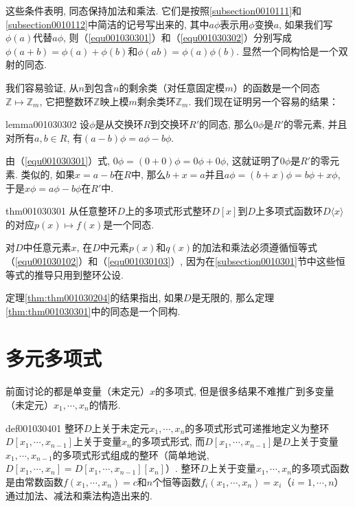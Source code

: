 这些条件表明, 同态保持加法和乘法. 它们是按照\ref{subsection0010111}和\ref{subsection0010112}中简洁的记号写出来的, 其中$a\phi$表示用$\phi$变换$a$, 如果我们写$\phi(a)$代替$a\phi$, 则（\ref{equ001030301}）和（\ref{equ001030302}）分别写成$\phi(a+b)=\phi(a)+\phi(b)$和$\phi(ab)=\phi(a)\phi(b)$. 显然一个同构恰是一个双射的同态. 

我们容易验证, 从$n$到包含$n$的剩余类（对任意固定模$m$）的函数是一个同态$\mathbb{Z}\mapsto \mathbb{Z}_m$, 它把整数环$\mathbb{Z}$映上模$m$剩余类环$\mathbb{Z}_m$. 我们现在证明另一个容易的结果：
\begin{lemma}{}{lemma001030302}
设$\phi$是从交换环$R$到交换环$R'$的同态, 那么$0\phi$是$R'$的零元素, 并且对所有$a, b \in R$, 有$(a-b)\phi = a\phi - b\phi$. 
\end{lemma}

由（\ref{equ001030301}）式, $0\phi = (0+0)\phi = 0\phi + 0\phi$, 这就证明了$0\phi$是$R'$的零元素. 类似的, 如果$x=a-b$在$R$中, 那么$b+x=a$并且$a\phi = (b+x)\phi = b\phi+x\phi$, 于是$x\phi = a\phi - b\phi$在$R'$中. 

\begin{theorem}{}{thm001030301}
从任意整环$D$上的多项式形式整环$D[x]$到$D$上多项式函数环$D\langle{x}\rangle$的对应$p(x)\mapsto f(x)$是一个同态. 
\end{theorem}

对$D$中任意元素$x$, 在$D$中元素$p(x)$和$q(x)$的加法和乘法必须遵循恒等式（\ref{equ001030102}）和（\ref{equ001030103}）, 因为在\ref{subsection0010301}节中这些恒等式的推导只用到整环公设. 

定理\ref{thm:thm001030204}的结果指出, 如果$D$是无限的, 那么定理\ref{thm:thm001030301}中的同态是一个同构. 


\section{多元多项式}\label{subsection0010304}
前面讨论的都是单变量（未定元）$x$的多项式, 但是很多结果不难推广到多变量（未定元）$x_1, \cdots, x_n$的情形. 
\begin{definition}{}{def001030401}
整环$D$上关于未定元$x_1, \cdots, x_n$的多项式形式可递推地定义为整环$D[x_1,\cdots,x_{n-1}]$上关于变量$x_n$的多项式形式, 而$D[x_1,\cdots,x_{n-1}]$是$D$上关于变量$x_1,\cdots, x_{n-1}$的多项式形式组成的整环（简单地说, $D[x_1,\cdots, x_n]=D[x_1, \cdots, x_{n-1}][x_n]$）. 整环$D$上关于变量$x_1,\cdots, x_n$的多项式函数是由常数函数$f(x_1,\cdots,x_n)=c$和$n$个恒等函数$f_i(x_1,\cdots,x_n)=x_i$（$i=1,\cdots,n$）通过加法、减法和乘法构造出来的. 
\end{definition}

